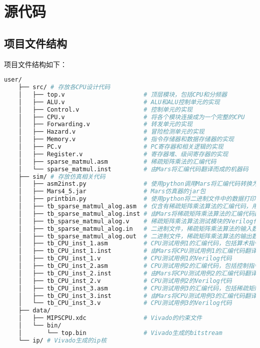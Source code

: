 \section{源代码}

\subsection{项目文件结构}
项目文件结构如下：
\begin{lstlisting}[language={bash}, numbers=none]
    user/
    ├── src/ # 存放各CPU设计代码
    │   ├── top.v                      # 顶层模块，包括CPU和分频器
    │   ├── ALU.v                      # ALU和ALU控制单元的实现
    │   ├── Control.v                  # 控制单元的实现
    │   ├── CPU.v                      # 将各个模块连接成为一个完整的CPU
    │   ├── Forwarding.v               # 转发单元的实现
    │   ├── Hazard.v                   # 冒险检测单元的实现
    │   ├── Memory.v                   # 指令存储器和数据存储器的实现
    │   ├── PC.v                       # PC寄存器和相关逻辑的实现
    │   ├── Register.v                 # 寄存器堆、级间寄存器的实现
    │   ├── sparse_matmul.asm          # 稀疏矩阵乘法的汇编代码
    │   └── sparse_matmul.inst         # 由Mars将汇编代码翻译而成的机器码
    ├── sim/ # 存放仿真相关代码
    │   ├── asm2inst.py                # 使用python调用Mars将汇编代码转换为机器码
    │   ├── Mars4_5.jar                # Mars仿真器的jar包
    │   ├── printbin.py                # 使用python将二进制文件中的数据打印出来
    │   ├── tb_sparse_matmul_alog.asm  # 仅含有稀疏矩阵乘法算法的汇编代码，用于统计指令数
    │   ├── tb_sparse_matmul_alog.inst # 由Mars将稀疏矩阵乘法算法的汇编代码翻译成的机器码
    │   ├── tb_sparse_matmul_alog.v    # 稀疏矩阵乘法算法测试模块的Verilog代码
    │   ├── tb_sparse_matmul_alog.in   # 二进制文件，稀疏矩阵乘法算法的输入数据
    │   ├── tb_sparse_matmul_alog.out  # 二进制文件，稀疏矩阵乘法算法的输出数据
    │   ├── tb_CPU_inst_1.asm          # CPU测试用例1的汇编代码，包括算术指令和转发
    │   ├── tb_CPU_inst_1.inst         # 由Mars将CPU测试用例1的汇编代码翻译成的机器码
    │   ├── tb_CPU_inst_1.v            # CPU测试用例1的Verilog代码
    │   ├── tb_CPU_inst_2.asm          # CPU测试用例2的汇编代码，包括控制指令和冒险
    │   ├── tb_CPU_inst_2.inst         # 由Mars将CPU测试用例2的汇编代码翻译成的机器码
    │   ├── tb_CPU_inst_2.v            # CPU测试用例2的Verilog代码
    │   ├── tb_CPU_inst_3.asm          # CPU测试用例3的汇编代码，包括稀疏矩阵乘法和BCD7显示
    │   ├── tb_CPU_inst_3.inst         # 由Mars将CPU测试用例3的汇编代码翻译成的机器码
    │   └── tb_CPU_inst_3.v            # CPU测试用例3的Verilog代码
    ├── data/
    │   ├── MIPSCPU.xdc                # Vivado的约束文件
    │   └── bin/
    │       └── top.bin                # Vivado生成的bitstream
    └── ip/ # Vivado生成的ip核
\end{lstlisting}

